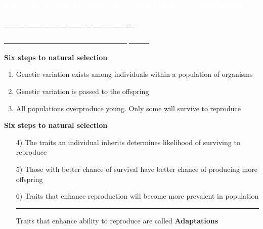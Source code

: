 \documentclass[t]{beamer}
\begin{document}
%

{
\begin{frame}{\textcolor{white}{\bfseries Iron is strong, durable, and can be shaped, sharpened, and welded.}}

\tinyfill \href{https://upload.wikimedia.org/wikipedia/commons/thumb/8/8c/3_tourist_helping_artist_blacksmith_in_finland.JPG/1024px-3_tourist_helping_artist_blacksmith_in_finland.JPG}{\textcolor{white}{Finnish blacksmiths, wasapl, Wikimedia, .}}
\end{frame}
}

{
\begin{frame}

\tinyfill \href{https://www.flickr.com/photos/mikebaird/530816116/}{\textcolor{white}{American Coot and Chicks. Mike Baird, Flickr }}
\end{frame}
}

%
\begin{frame}[t]{\LARGE \bfseries \hfill Six steps to natural selection \hfill}

\Large
\begin{enumerate}
\item Genetic variation exists among individuals within a population of organisms

\bigskip

\item Genetic variation is passed to the offspring

\bigskip

\item All populations overproduce young. Only some will survive to reproduce

\end{enumerate}
\end{frame}
%

\begin{frame}[t]{\LARGE \bfseries \hfill Six steps to natural selection \hfill}

\Large

\begin{enumerate}
\item[\color{black}4)] The traits an individual inherits determines likelihood of surviving to reproduce

\bigskip

\item[\color{black}5)] Those with better chance of survival have better chance of producing more offspring

\bigskip

\item[\color{black}6)] Traits that enhance reproduction will become more prevalent in population

\rule{\linewidth}{0.4pt}

\centering Traits that enhance ability to reproduce are called 
\textbf{Adaptations}

\end{enumerate}
\end{frame}
\end{document}

